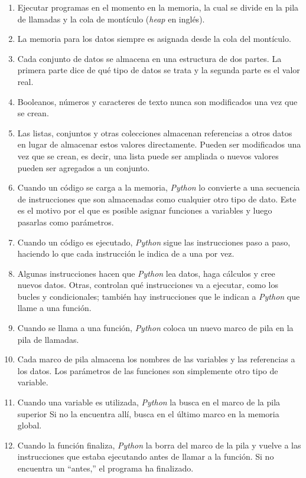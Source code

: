 \begin{enumerate}

\item
Ejecutar programas en el momento en la memoria,
la cual se divide en la pila de llamadas y la cola de montículo (\emph{heap} en inglés).

\item
  La memoria para los datos siempre es asignada desde la cola del montículo. 

\item
Cada conjunto de datos se almacena en una estructura de dos partes.
La primera parte dice de qué tipo de datos se trata
y la segunda parte es el valor real.

\item
Booleanos, números y caracteres de texto nunca son modificados una vez que se crean. 

\item
Las listas, conjuntos y otras colecciones almacenan referencias a otros datos
en lugar de almacenar estos valores directamente.
Pueden ser modificados una vez que se crean,
es decir, una lista puede ser ampliada o nuevos valores pueden ser agregados a un conjunto.
  
\item
Cuando un código se carga a la memoria,
\emph{Python} lo convierte a una secuencia de instrucciones
que son almacenadas como cualquier otro tipo de dato.
Este es el motivo por el que es posible asignar funciones a variables
y luego pasarlas como parámetros.

\item
Cuando un código es ejecutado,
\emph{Python} sigue las instrucciones paso a paso,
haciendo lo que cada instrucción le indica de a una por vez.

\item
Algunas instrucciones hacen que \emph{Python} lea datos,
haga cálculos
y cree nuevos datos.
Otras, controlan qué instrucciones va a ejecutar,
como los bucles y condicionales; también hay instrucciones que  
le indican a \emph{Python} que llame a una función.

\item
  Cuando se llama a una función,
\emph{Python} coloca un nuevo marco de pila en la pila de llamadas.

\item
Cada marco de pila almacena los nombres de las variables y las referencias a los datos.
Los parámetros de las funciones son simplemente otro tipo de variable.

\item
Cuando una variable es utilizada,
\emph{Python} la busca en el marco de la pila superior
Si no la encuentra allí, busca en el último marco en la memoria global.
 
\item
Cuando la función finaliza, 
\emph{Python} la borra del marco de la pila y vuelve
a las instrucciones que estaba ejecutando antes de llamar a la función.
Si no encuentra un ``antes,''
  el programa ha finalizado.

\end{enumerate}

